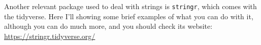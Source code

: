 \documentclass[
]{book}
\newenvironment{Shaded}{\begin{snugshade}}{\end{snugshade}}
\newcommand{\AttributeTok}[1]{\textcolor[rgb]{0.77,0.63,0.00}{#1}}
\newcommand{\CommentTok}[1]{\textcolor[rgb]{0.56,0.35,0.01}{\textit{#1}}}
\newcommand{\ConstantTok}[1]{\textcolor[rgb]{0.00,0.00,0.00}{#1}}
\newcommand{\FunctionTok}[1]{\textcolor[rgb]{0.00,0.00,0.00}{#1}}
\newcommand{\NormalTok}[1]{#1}
\newcommand{\OtherTok}[1]{\textcolor[rgb]{0.56,0.35,0.01}{#1}}
\newcommand{\SpecialCharTok}[1]{\textcolor[rgb]{0.00,0.00,0.00}{#1}}
\newcommand{\StringTok}[1]{\textcolor[rgb]{0.31,0.60,0.02}{#1}}
\begin{document}
Another relevant package used to deal with strings is \texttt{stringr}, which comes with the tidyverse.
Here I'll showing some brief examples of what you can do with it, although you can do much more, and you should check its website: \url{https://stringr.tidyverse.org/}

\begin{Shaded}
\end{Shaded}
\end{document}
